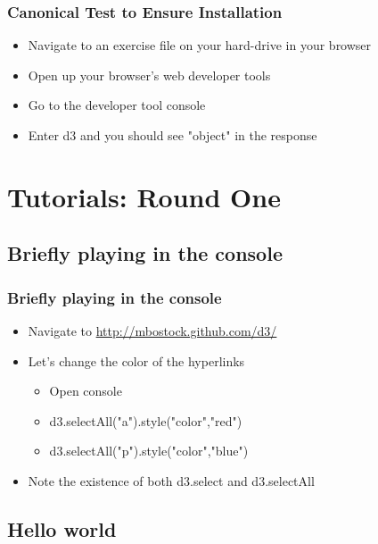\documentclass{beamer}
\begin{document}
\begin{frame}
    \frametitle{Canonical Test to Ensure Installation}
    \begin{itemize}
\pause
    \item Navigate to an exercise file on your hard-drive in your browser
\pause
    \item Open up your browser's web developer tools
\pause
    \item Go to the developer tool console
\pause
    \item Enter d3 and you should see "object" in the response
\pause
    \end{itemize}
\end{frame}




\section{Tutorials: Round One}

\subsection{Briefly playing in the console}

\begin{frame}
    \frametitle{Briefly playing in the console}
    \begin{itemize}
    \item Navigate to \href{http://mbostock.github.com/d3/}{http://mbostock.github.com/d3/}
    \item Let's change the color of the hyperlinks
        \begin{itemize}
        \item Open console
        \item d3.selectAll("a").style("color","red")
        \item d3.selectAll("p").style("color","blue")
        \end{itemize}
    \item Note the existence of both d3.select and d3.selectAll
    \end{itemize}
\end{frame}



\subsection{Hello world}
\end{document}
